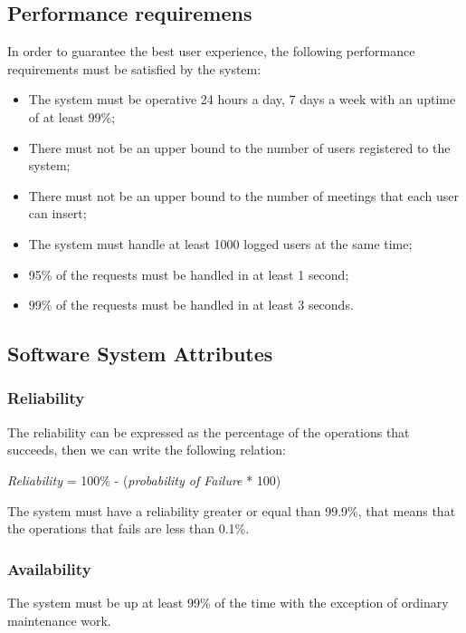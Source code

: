 \documentclass{article}
\begin{document}
	
	\subsection{Performance requiremens}
	In order to guarantee the best user experience, the following performance requirements must be satisfied by the system:
	\begin{itemize}
		\item The system must be operative 24 hours a day, 7 days a week with an uptime of at least 99\%;
		\item There must not be an upper bound to the number of users registered to the system;
		\item There must not be an upper bound to the number of meetings that each user can insert; 
		\item The system must handle at least 1000 logged users at the same time;
		\item 95\% of the requests must be handled in at least 1 second; \footnotemark[1]
		\item 99\%  of the requests must be handled in at least 3 seconds. \footnotemark[1]
	\end{itemize}
	
	\bigskip
	\noindent
	
	
	\subsection{Software System Attributes}
	
	
	\subsubsection{Reliability}
	The reliability can be expressed as the percentage of the operations that succeeds, then we can write the following relation:
	
	\bigskip
	\begin{center}
		\textit{Reliability}  = 100\% - (\textit{probability of Failure} * 100)
	\end{center}

	\bigskip
	The system must have a reliability greater or equal than 99.9\%, that means that the operations that fails are less than 0.1\%.

	
	\subsubsection{Availability}
	The system must be up at least 99\% of the time with the exception of ordinary maintenance work.
	
\end{document}
